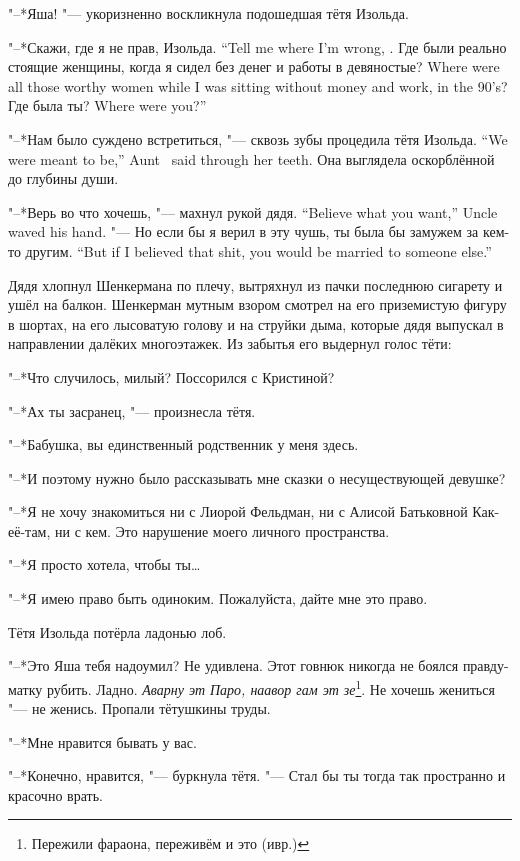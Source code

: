 "--*Яша! "--- укоризненно воскликнула подошедшая тётя Изольда.

{"--*Скажи, где я не прав, Изольда.}
{``Tell me where I'm wrong, \Izolda.}
{Где были реально стоящие женщины, когда я сидел без денег и работы в девяностые?}
{Where were all those worthy women while I was sitting without money and work, in the 90's?}
{Где была ты?}
{Where were you?''}

{"--*Нам было суждено встретиться, "--- сквозь зубы процедила тётя Изольда.}
{``We were meant to be,'' Aunt \Izolda\ said through her teeth.}
Она выглядела оскорблённой до глубины души.

{"--*Верь во что хочешь, "--- махнул рукой дядя.}
{``Believe what you want,'' Uncle waved his hand.}
{"--- Но если бы я верил в эту чушь, ты была бы замужем за кем-то другим.}
{``But if I believed that shit, you would be married to someone else.''}

Дядя хлопнул Шенкермана по плечу, вытряхнул из пачки последнюю сигарету и ушёл на балкон.
Шенкерман мутным взором смотрел на его приземистую фигуру в шортах, на его лысоватую голову и на струйки дыма, которые дядя выпускал в направлении далёких многоэтажек.
Из забытья его выдернул голос тёти:

"--*Что случилось, милый?
Поссорился с Кристиной?

\asterism

"--*Ах ты засранец, "--- произнесла тётя.

"--*Бабушка, вы единственный родственник у меня здесь.

"--*И поэтому нужно было рассказывать мне сказки о несуществующей девушке?

"--*Я не хочу знакомиться ни с Лиорой Фельдман, ни с Алисой Батьковной Как-её-там, ни с кем.
Это нарушение моего личного пространства.

"--*Я просто хотела, чтобы ты\dots{}

"--*Я имею право быть одиноким.
Пожалуйста, дайте мне это право.

Тётя Изольда потёрла ладонью лоб.

"--*Это Яша тебя надоумил?
Не удивлена.
Этот говнюк никогда не боялся правду-матку рубить.
Ладно.
\textit{Аварну эт Паро, наавор гам эт зе}\footnote{Пережили фараона, переживём и это (ивр.)}.
Не хочешь жениться "--- не женись.
Пропали тётушкины труды.

"--*Мне нравится бывать у вас.

"--*Конечно, нравится, "--- буркнула тётя.
"--- Стал бы ты тогда так пространно и красочно врать.

